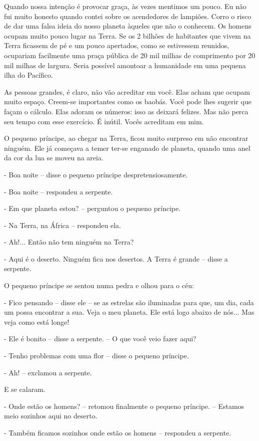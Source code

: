 Quando nossa intenção é provocar graça, às vezes mentimos um pouco. Eu
não fui muito honesto quando contei sobre os acendedores de lampiões.
Corro o risco de dar uma falsa ideia do nosso planeta àqueles que não o
conhecem. Os homens ocupam muito pouco lugar na Terra. Se os 2 bilhões
de habitantes que vivem na Terra ficassem de pé e um pouco apertados,
como se estivessem reunidos, ocupariam facilmente uma praça pública de
20 mil milhas de comprimento por 20 mil milhas de largura. Seria
possível amontoar a humanidade em uma pequena ilha do Pacífico.

As pessoas grandes, é claro, não vão acreditar em você. Elas acham que
ocupam muito espaço. Creem-se importantes como os baobás. Você pode lhes
sugerir que façam o cálculo. Elas adoram os números: isso as deixará
felizes. Mas não perca seu tempo com esse exercício. É inútil. Vocês
acreditam em mim.

O pequeno príncipe, ao chegar na Terra, ficou muito surpreso em não
encontrar ninguém. Ele já começava a temer ter-se enganado de planeta,
quando uma anel da cor da lua se moveu na areia.

- Boa noite -- disse o pequeno príncipe despretensiosamente.

- Boa noite -- respondeu a serpente.

- Em que planeta estou? -- perguntou o pequeno príncipe.

- Na Terra, na África -- respondeu ela.

- Ah!... Então não tem ninguém na Terra?

- Aqui é o deserto. Ninguém fica nos desertos. A Terra é grande -- disse
a serpente.

O pequeno príncipe se sentou numa pedra e olhou para o céu:

- Fico pensando -- disse ele -- se as estrelas são iluminadas para que,
um dia, cada um possa encontrar a sua. Veja o meu planeta. Ele está logo
abaixo de nós... Mas veja como está longe!

- Ele é bonito -- disse a serpente. -- O que você veio fazer aqui?

- Tenho problemas com uma flor -- disse o pequeno príncipe.

- Ah! -- exclamou a serpente.

E se calaram.

- Onde estão os homens? -- retomou finalmente o pequeno príncipe. --
Estamos meio sozinhos aqui no deserto.

- Também ficamos sozinhos onde estão os homens -- respondeu a serpente.

